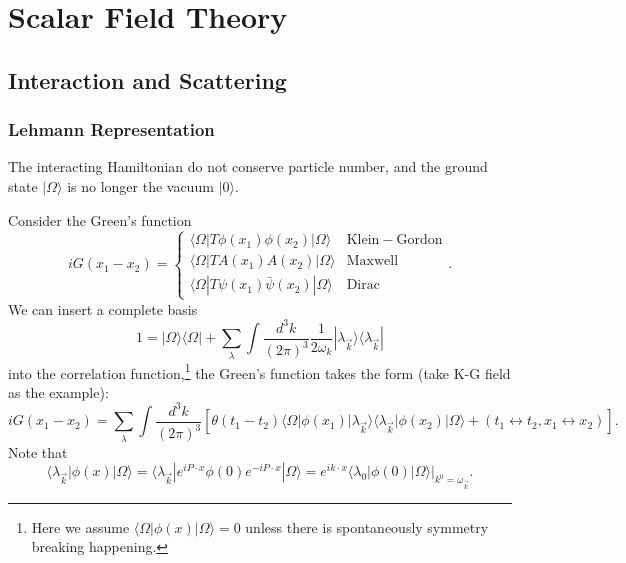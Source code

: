 \chapter{Scalar Field Theory}

\section{Interaction and Scattering}

\subsection{Lehmann Representation}
The interacting Hamiltonian do not conserve particle number, and the ground state $|\Omega\rangle$ is no longer the vacuum $|0\rangle$.

Consider the Green's function
\begin{equation*}
	iG(x_1-x_2) = \begin{cases}
		\langle\Omega|T\phi(x_1)\phi(x_2)|\Omega\rangle & \mathrm{Klein-Gordon} \\
		\langle\Omega|T A(x_1)A(x_2)|\Omega\rangle & \mathrm{Maxwell} \\
		\langle\Omega|T\psi(x_1)\bar\psi(x_2)|\Omega\rangle & \mathrm{Dirac}
	\end{cases}.
\end{equation*}
We can insert a complete basis 
\begin{equation*}
	1 = |\Omega\rangle\langle\Omega| + \sum_\lambda\int\frac{d^3 k}{(2\pi)^3}\frac{1}{2\omega_k}|\lambda_{\vec k}\rangle \langle\lambda_{\vec k}|
\end{equation*}
into the correlation function,\footnote{Here we assume $\langle\Omega|\phi(x)|\Omega\rangle=0$ unless there is spontaneously symmetry breaking happening.} the Green's function takes the form (take K-G field as the example):
\begin{equation*}
	iG(x_1-x_2) = \sum_\lambda \int\frac{d^3 k}{(2\pi)^3}
	\left[\theta(t_1-t_2)\langle\Omega|\phi(x_1)|\lambda_{\vec k}\rangle\langle\lambda_{\vec k}|\phi(x_2)|\Omega\rangle + (t_1\leftrightarrow t_2, x_1 \leftrightarrow x_2)\right].
\end{equation*}
Note that
\begin{equation*}
	\langle\lambda_{\vec k}|\phi(x)|\Omega\rangle 
	= \langle\lambda_{\vec k}|e^{iP\cdot x}\phi(0) e^{-iP\cdot x}|\Omega\rangle
	= e^{ik\cdot x} \left.\langle\lambda_{0}|\phi(0)|\Omega\rangle\right|_{k^0=\omega_{\vec k}}.
\end{equation*}
